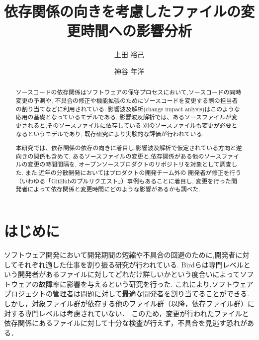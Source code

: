 \documentclass{fose2016}           %
\title{依存関係の向きを考慮したファイルの変更時間への影響分析}
\author{上田 裕己}{Ueda Yuki, 島根大学}
\author{神谷 年洋}{Kamiya Toshihiro, 島根大学}
\begin{document}
\maketitle

\begin{abstract}


 


ソースコードの依存関係はソフトウェアの保守プロセスにおいて,ソースコードの同時変更の予測や,
不具合の修正や機能拡張のためにソースコードを変更する際の担当者の割り当てなどに利用されている.
影響波及解析(change impact anlysis)はこのような応用の基礎となっているモデルである.
影響波及解析では、あるソースファイルが変更されると,そのソースファイルに依存している
別のソースファイルも変更が必要となるというモデルであり,
既存研究により実験的な評価が行われている.

本研究では、依存関係の依存の向きに着目し,影響波及解析で仮定されている方向と逆向きの関係も含めて,
あるソースファイルの変更と,依存関係がある他のソースファイルの変更の時間間隔を,
オープンソースプロダクトのリポジトリを対象として調査した.
また,近年の分散開発においてはプロダクトの開発チーム外の
開発者が修正を行う（いわゆる「GitHubのプルリクエスト」）事例もあることに着目し,
変更を行った開発者によって依存関係と変更時間にどのような影響があるかも調べた.

\end{abstract}

\begin{eabstract}

\end{eabstract}

\section{はじめに} 
ソフトウェア開発において開発期間の短縮や不具合の回避のために,開発者に対してそれぞれ適した仕事を割り振る研究が行われている\cite{Bird,Patanamon}.
Bird\cite{Bird}らは専門レベルという開発者があるファイルに対してどれだけ詳しいかという度合いによってソフトウェアの故障率に影響を与えるという研究を行った.
これにより,ソフトウェアプロジェクトの管理者は問題に対して最適な開発者を割り当てることができる.
しかし，対象ファイル群が依存する他のファイル群（以降，依存ファイル群）に対する専門レベルは考慮されていない．
このため，変更が行われたファイルと依存関係にあるファイルに対して十分な検査が行えず，不具合を見逃す恐れがある．
\end{document}
